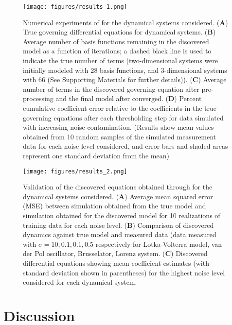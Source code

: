 \documentclass[12pt]{article}
\begin{document}
\begin{figure}[h!]
\texttt{[image: figures/results\_1.png]}
\caption{Numerical experiments of \ours{} for the dynamical systems considered. (\textbf{A}) True governing differential equations for dynamical systems. (\textbf{B}) Average number of basis functions remaining in the discovered model as a function of \ours{} iterations; a dashed black line is used to indicate the true number of terms (two-dimensional systems were initially modeled with 28 basis functions, and 3-dimensional systems with 66 (See Supporting Materials for further details)). (\textbf{C}) Average number of terms in the discovered governing equation after pre-processing and the final model after \ours{} converged. (\textbf{D}) Percent cumulative coefficient error relative to the coefficients in the true governing equations after each thresholding step for data simulated with increasing noise contamination. (Results show mean values obtained from 10 random samples of the simulated measurement data for each noise level considered, and error bars and shaded areas represent one standard deviation from the mean)}
\end{figure}

\begin{figure}[h!]
\texttt{[image: figures/results\_2.png]}
\caption{Validation of the discovered equations obtained through \ours{} for the dynamical systems considered. (\textbf{A}) Average mean squared error (MSE) between simulation obtained from the true model and simulation obtained for the discovered model for 10 realizations of training data for each noise level. (\textbf{B}) Comparison of discovered dynamics against true model and measured data (data measured with $\sigma =10, 0.1, 0.1, 0.5$ respectively for Lotka-Volterra model, van der Pol oscillator, Brusselator, Lorenz system. (\textbf{C}) Discovered differential equations showing mean coefficient estimates (with standard deviation shown in parentheses) for the highest noise level considered for each dynamical system.}
\end{figure}

\section*{Discussion}
\end{document}
